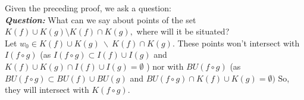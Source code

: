 \documentclass[a4paper,12pt]{amsart}
\numberwithin{equation}{section}
\begin{document}
Given the preceding proof, we ask a question:\\
\textit{\textbf{Question:}}  What can we say about points of the set $K(f) \cup K(g)\setminus K(f)\cap K(g),$ where  will it be situated?\\
  Let $w_0 \in K(f) \cup K(g) \ \backslash \ K(f) \cap K(g)$. These points won't intersect with $I(f \circ g)$ (as $I(f \circ g) \subset I(f) \cup I(g)$ and $K(f)\cup K(g) \cap I(f) \cup I(g)=\emptyset$ \cite{d1}) nor with $BU(f \circ g)$ (as $BU(f \circ g)\subset BU(f)\cup BU(g)$ and $BU(f \circ g) \cap K(f) \cup K(g)= \emptyset)$ So, they will intersect with $K(f \circ g).$    
\end{document}
